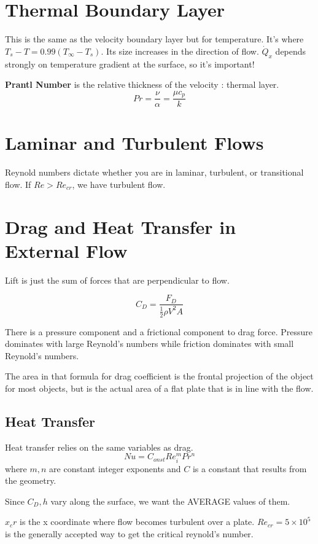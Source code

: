 \documentclass[a4paper,12pt]{report}
\begin{document}
\section{Thermal Boundary Layer}
This is the same as the velocity boundary layer but for temperature. It's where $T_s - T = 0.99(T_\infty - T_s)$. Its size 
increases in the direction of flow. $\dot{Q}_x$ depends strongly on temperature gradient at the surface, so it's important!

\textbf{Prantl Number} is the relative thickness of the velocity : thermal layer. $$Pr = \frac{\nu}{\alpha} = \frac{\mu c_p}{k}$$

\section{Laminar and Turbulent Flows}

Reynold numbers dictate whether you are in laminar, turbulent, or transitional flow. If $Re > Re_{cr}$, we have turbulent flow.

\section{Drag and Heat Transfer in External Flow}

Lift is just the sum of forces that are perpendicular to flow. 

$$C_D = \frac{F_D}{\frac{1}{2}\rho V^2 A}$$

There is a pressure component and a frictional component to drag force. Pressure dominates with large Reynold's numbers while friction 
dominates with small Reynold's numbers. 

The area in that formula for drag coefficient is the frontal projection of the object for most objects, but is the actual area of a 
flat plate that is in line with the flow. 

\subsection{Heat Transfer}
Heat transfer relies on the same variables as drag. $$Nu = C_{onst} Re_i^m Pr^n$$ where $m, n$ are constant integer exponents and $C$ is 
a constant that results from the geometry. 

Since $C_D, h$ vary along the surface, we want the AVERAGE values of them. 

$x_cr$ is the x coordinate where flow becomes turbulent over a plate. $Re_{cr} = 5 \times 10^5$ is the generally 
accepted way to get the critical reynold's number. 
\end{document}
